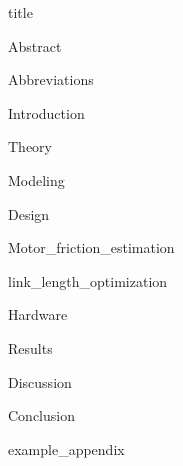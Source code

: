 \documentclass{article}
\begin{document}
{title}

\frontmatter

{Abstract}


\newpage
\tableofcontents

\listoffigures
\listoftables

\mainmatter

{Abbreviations}

{Introduction}
\newpage

{Theory}

{Modeling}

{Design}

{Motor_friction_estimation}

{link_length_optimization}

{Hardware}


{Results}

{Discussion}

{Conclusion}


\newpage
\printbibliography[heading = bibintoc, title = Bibliography]    %

\addappendix
{example_appendix}

\end{document}
